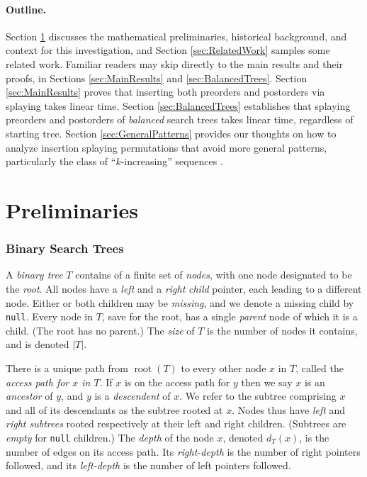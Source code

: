 \documentclass{article}
\theoremstyle{plain}
\theoremstyle{definition}
\DeclareMathOperator{\Root}{root}
\begin{document}
%
\paragraph{Outline.} Section \ref{sec:Introduction} discusses the mathematical
preliminaries, historical background, and context for this investigation, and
Section \ref{sec:RelatedWork} samples some related work. Familiar readers may
skip directly to the main results and their proofs, in Sections
\ref{sec:MainResults} and \ref{sec:BalancedTrees}. Section
\ref{sec:MainResults} proves that inserting both preorders and postorders via
splaying takes linear time. Section \ref{sec:BalancedTrees} establishes that
splaying preorders and postorders of \emph{balanced} search trees
\cite{WEIGHT_BALANCED_TREES} takes linear time, regardless of starting tree.
Section \ref{sec:GeneralPatterns} provides our thoughts on how to analyze
insertion splaying permutations that avoid more general patterns, particularly the class of ``$k$-increasing'' sequences \cite{PATTERN_AVOIDANCE}.


\section{Preliminaries}\label{sec:Introduction}

\subsubsection*{Binary Search Trees}

%
A \emph{binary tree} $T$ contains of a finite set of \emph{nodes}, with one
node designated to be the \emph{root}. All nodes have a \emph{left} and a
\emph{right} \emph{child} pointer, each leading to a different node. Either or
both children may be \emph{missing}, and we denote a missing child by
\texttt{null}. Every node in $T$, save for the root, has a single
\emph{parent} node of which it is a child. (The root has no parent.) The
\emph{size} of $T$ is the number of nodes it contains, and is denoted $|T|$.

%
There is a unique path from $\Root(T)$ to every other node $x$ in $T$, called
the \emph{access path for $x$ in $T$}. If $x$ is on the access path for $y$
then we say $x$ is an \emph{ancestor} of $y$, and $y$ is a \emph{descendent} of
$x$. We refer to the subtree comprising $x$ and all of its descendants as the
subtree rooted at $x$. Nodes thus have \emph{left} and \emph{right subtrees}
rooted respectively at their left and right children. (Subtrees are
\emph{empty} for \texttt{null} children.) The \emph{depth} of the node $x$,
denoted $d_T(x)$, is the number of edges on its access path. Its
\emph{right-depth} is the number of right pointers followed, and its
\emph{left-depth} is the number of left pointers followed.
\end{document}
